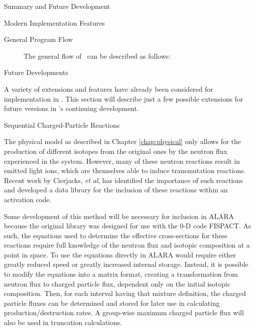 \begin{chapter}{Summary and Future Development}
\begin{section}{Modern Implementation Features\label{sec:summary.modern}}
    \newpage
    \begin{subsection}{General Program Flow}
      
      \begin{figure}[htbp]
        \caption{The general flow of \ALARA\  can be described as follows:}
        \label{fig:summary.prog_flow}
      \end{figure}
      \begin{center}
      \end{center}
    
    \end{subsection}
    
  \end{section}
  
  \begin{section}{Future Developments}
  
    A variety of extensions and features have already been considered
    for implementation in \ALARA.  This section will describe just a
    few possible extensions for future versions in \ALARA's continuing
    development.

    \begin{subsection}{Sequential Charged-Particle Reactions}\label{ssec:future.data.seq}
    
      The physical model as described in Chapter \ref{chap:physical}
      only allows for the production of different isotopes from the
      original ones by the neutron flux experienced in the system.
      However, many of these neutron reactions result in emitted light
      ions, which are themselves able to induce transmutation
      reactions.  Recent work by Cierjacks, \textsl{et
        al}\cite{sequential}, has identified the importance of such
      reactions and developed a data library for the inclusion of
      these reactions within an activation code.
    
      Some development of this method will be necessary for inclusion
      in ALARA because the original library was designed for use with
      the 0-D code FISPACT.  As such, the equations used to determine
      the effective cross-sections for these reactions require full
      knowledge of the neutron flux and isotopic composition at a
      point in space.  To use the equations directly in ALARA would
      require either greatly reduced speed or greatly increased
      internal storage.  Instead, it is possible to modify the
      equations into a matrix format, creating a transformation from
      neutron flux to charged particle flux, dependent only on the
      initial isotopic composition.  Then, for each interval having
      that mixture definition, the charged particle fluxes can be
      determined and stored for later use in calculating
      production/destruction rates.  A group-wise maximum charged
      particle flux will also be used in truncation calculations.
    

\end{subsection}
\end{section}
\end{chapter}
